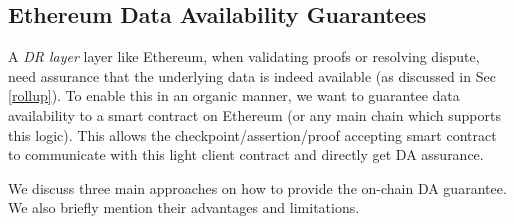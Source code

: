 \documentclass[sigconf, screen=true, nonacm]{acmart}
\newcommand{\DR}{\textit{DR layer}}
\begin{document}
    \subsection{Ethereum Data Availability Guarantees}
        A \DR{} layer like Ethereum, when validating proofs or resolving dispute, need assurance that the underlying data is indeed available (as discussed in Sec \ref{rollup}). To enable this in an organic manner, we want to guarantee data availability to a smart contract on Ethereum (or any main chain which supports this logic). This allows the checkpoint/assertion/proof accepting smart contract to communicate with this light client contract and directly get DA assurance. 

        We discuss three main approaches on how to provide the on-chain DA guarantee. We also briefly mention their advantages and limitations. 

        
\end{document}
